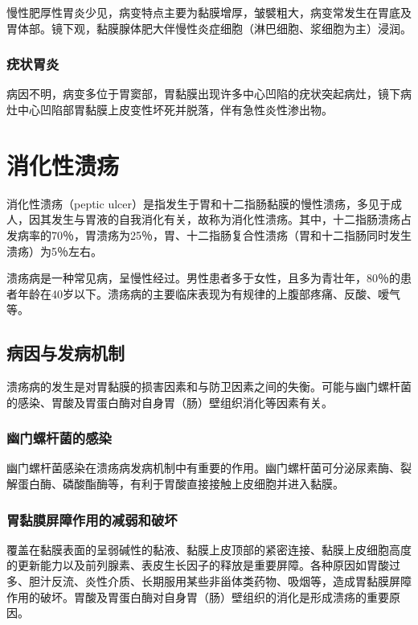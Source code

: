 慢性肥厚性胃炎少见，病变特点主要为黏膜增厚，皱襞粗大，病变常发生在胃底及胃体部。镜下观，黏膜腺体肥大伴慢性炎症细胞（淋巴细胞、浆细胞为主）浸润。

\subsubsection{疣状胃炎}

病因不明，病变多位于胃窦部，胃黏膜出现许多中心凹陷的疣状突起病灶，镜下病灶中心凹陷部胃黏膜上皮变性坏死并脱落，伴有急性炎性渗出物。

\section{消化性溃疡}

消化性溃疡（peptic
ulcer）是指发生于胃和十二指肠黏膜的慢性溃疡，多见于成人，因其发生与胃液的自我消化有关，故称为消化性溃疡。其中，十二指肠溃疡占发病率的70％，胃溃疡为25％，胃、十二指肠复合性溃疡（胃和十二指肠同时发生溃疡）为5％左右。

溃疡病是一种常见病，呈慢性经过。男性患者多于女性，且多为青壮年，80％的患者年龄在40岁以下。溃疡病的主要临床表现为有规律的上腹部疼痛、反酸、嗳气等。

\subsection{病因与发病机制}

溃疡病的发生是对胃黏膜的损害因素和与防卫因素之间的失衡。可能与幽门螺杆菌的感染、胃酸及胃蛋白酶对自身胃（肠）壁组织消化等因素有关。

\subsubsection{幽门螺杆菌的感染}

幽门螺杆菌感染在溃疡病发病机制中有重要的作用。幽门螺杆菌可分泌尿素酶、裂解蛋白酶、磷酸酯酶等，有利于胃酸直接接触上皮细胞并进入黏膜。

\subsubsection{胃黏膜屏障作用的减弱和破坏}

覆盖在黏膜表面的呈弱碱性的黏液、黏膜上皮顶部的紧密连接、黏膜上皮细胞高度的更新能力以及前列腺素、表皮生长因子的释放是重要屏障。各种原因如胃酸过多、胆汁反流、炎性介质、长期服用某些非甾体类药物、吸烟等，造成胃黏膜屏障作用的破坏。胃酸及胃蛋白酶对自身胃（肠）壁组织的消化是形成溃疡的重要原因。

